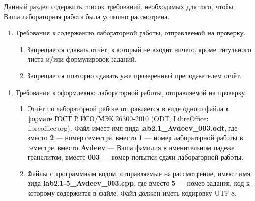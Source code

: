Данный раздел содержить список требований, необходимых для того, чтобы Ваша лабораторная работа была успешно рассмотрена.

\begin{enumerate}
	\item
		Требования к содержанию лабораторной работы, отправляемой на проверку.
	\begin{enumerate}
		\item
			Запрещается сдавать отчёт, в который не входит ничего, кроме титульного листа и/или формулировок заданий.
		\item
			Запрещается повторно сдавать уже проверенный преподавателем отчёт.			
	\end{enumerate}		

\end{enumerate}

\begin{enumerate}
	\item
		Требования к оформлению лабораторной работы, отправляемой на проверку.
	\begin{enumerate}
		\item
			Отчёт по лабораторной работе отправляется в виде одного файла в формате ГОСТ Р ИСО/МЭК 26300-2010 (ODT, LibreOffice: libreoffice.org).
			Файл имеет имя вида \textbf{lab2.1\_Avdeev\_003.odt},
			где вместо \textbf{2} --- номер семестра, вместо \textbf{1} --- номер лабораторной работы в семестре,
			вместо \textbf{Avdeev} --- Ваша фамилия в именительном падеже транслитом,
			вместо \textbf{003} --- номер попытки сдачи лабораторной работы.
		\item
			Файлы с программным кодом, отправляемые на рассмотрение, имеют имя вида \textbf{lab2.1-5\_Avdeev\_003.cpp},
			где вместо \textbf{5} --- номер задания, код к которому содержится в файле.
			Файл должен иметь кодировку UTF-8.
	\end{enumerate}		

\end{enumerate}


